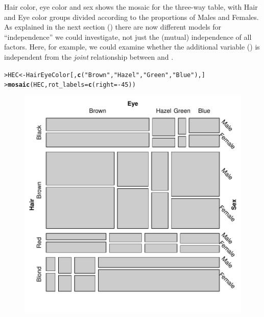\documentclass[10pt,krantz2]{krantz}\usepackage[]{graphicx}\usepackage[]{color}
\makeatletter
\newcommand{\hlnum}[1]{\textcolor[rgb]{0.686,0.059,0.569}{#1}}%
\newcommand{\hlstr}[1]{\textcolor[rgb]{0.192,0.494,0.8}{#1}}%
\newcommand{\hlopt}[1]{\textcolor[rgb]{0,0,0}{#1}}%
\newcommand{\hlstd}[1]{\textcolor[rgb]{0.345,0.345,0.345}{#1}}%
\newcommand{\hlkwb}[1]{\textcolor[rgb]{0.69,0.353,0.396}{#1}}%
\newcommand{\hlkwc}[1]{\textcolor[rgb]{0.333,0.667,0.333}{#1}}%
\newcommand{\hlkwd}[1]{\textcolor[rgb]{0.737,0.353,0.396}{\textbf{#1}}}%
\newenvironment{kframe}{%
 \def\at@end@of@kframe{}%
 \ifinner\ifhmode%
  \def\at@end@of@kframe{\end{minipage}}%
  \begin{minipage}{\columnwidth}%
 \fi\fi%
 \def\FrameCommand##1{\hskip\@totalleftmargin \hskip-\fboxsep
 \colorbox{shadecolor}{##1}\hskip-\fboxsep
     \hskip-\linewidth \hskip-\@totalleftmargin \hskip\columnwidth}%
 \MakeFramed {\advance\hsize-\width
   \@totalleftmargin\z@ \linewidth\hsize
   \@setminipage}}%
 {\par\unskip\endMakeFramed%
 \at@end@of@kframe}
\newenvironment{knitrout}{}{} %
\renewenvironment{knitrout}{\small\renewcommand{\baselinestretch}{.85}}{} %
\makeatother
\begin{document}
\begin{Example}[HEC1]{Hair color, eye color and sex}
 shows the mosaic for the three-way table, with Hair and Eye color
groups divided according to the proportions of Males and Females.
As explained in the next section ()
there are now different models for ``independence'' we could
investigate, not just the (mutual) independence of all factors. Here, for
example, we could examine whether the additional variable ()
is independent from the \emph{joint} relationship between  and .
\begin{knitrout}
\color{fgcolor}\begin{kframe}
\begin{alltt}
\hlstd{> }\hlstd{HEC} \hlkwb{<-} \hlstd{HairEyeColor[,} \hlkwd{c}\hlstd{(}\hlstr{"Brown"}\hlstd{,} \hlstr{"Hazel"}\hlstd{,} \hlstr{"Green"}\hlstd{,} \hlstr{"Blue"}\hlstd{),]}
\hlstd{> }\hlkwd{mosaic}\hlstd{(HEC,} \hlkwc{rot_labels} \hlstd{=} \hlkwd{c}\hlstd{(}\hlkwc{right} \hlstd{=} \hlopt{-}\hlnum{45}\hlstd{))}
\end{alltt}
\end{kframe}\begin{figure}[!htb]

\centerline{\includegraphics[width=.7\textwidth]{ch05/fig/HEC-mos1b-1} }


\end{figure}
\end{knitrout}
\end{Example}
\end{document}
